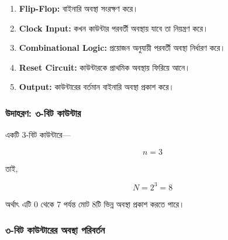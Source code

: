 \begin{enumerate}[leftmargin=*,itemsep=2pt]

    \item \textbf{\textenglish{Flip-Flop}:}
    বাইনারি অবস্থা সংরক্ষণ করে।

    \item \textbf{\textenglish{Clock Input}:}
    কখন কাউন্টার পরবর্তী অবস্থায় যাবে তা নিয়ন্ত্রণ করে।

    \item \textbf{\textenglish{Combinational Logic}:}
    প্রয়োজন অনুযায়ী পরবর্তী অবস্থা নির্ধারণ করে।

    \item \textbf{\textenglish{Reset Circuit}:}
    কাউন্টারকে প্রাথমিক অবস্থায় ফিরিয়ে আনে।

    \item \textbf{\textenglish{Output}:}
    কাউন্টারের বর্তমান বাইনারি অবস্থা প্রকাশ করে।

\end{enumerate}

\subsubsection*{উদাহরণ: ৩-বিট কাউন্টার}

একটি \(3\)-বিট কাউন্টারে—

\[
n=3
\]

তাই,

\[
N=2^3=8
\]

অর্থাৎ এটি \(0\) থেকে \(7\) পর্যন্ত মোট \(8\)টি ভিন্ন অবস্থা প্রকাশ করতে পারে।



\subsubsection*{৩-বিট কাউন্টারের অবস্থা পরিবর্তন}

